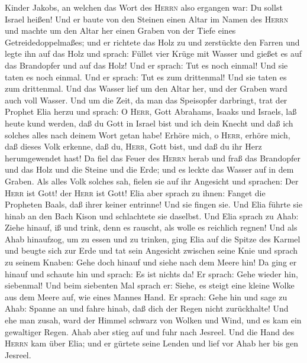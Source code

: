 Kinder Jakobs, an welchen das Wort des \textsc{Herrn} also ergangen war:
Du sollst Israel heißen!  Und er baute von den Steinen
einen Altar im Namen des \textsc{Herrn} und machte um den Altar her
einen Graben von der Tiefe eines Getreidedoppelmaßes; 
und er richtete das Holz zu und zerstückte den Farren und legte ihn auf
das Holz und sprach:  Füllet vier Krüge mit Wasser und
gießet es auf das Brandopfer und auf das Holz! Und er sprach: Tut es
noch einmal! Und sie taten es noch einmal. Und er sprach: Tut es zum
drittenmal! Und sie taten es zum drittenmal.  Und das
Wasser lief um den Altar her, und der Graben ward auch voll Wasser.
 Und um die Zeit, da man das Speisopfer darbringt, trat
der Prophet Elia herzu und sprach: O \textsc{Herr}, Gott Abrahams,
Isaaks und Israels, laß heute kund werden, daß du Gott in Israel bist
und ich dein Knecht und daß ich solches alles nach deinem Wort getan
habe!  Erhöre mich, o \textsc{Herr}, erhöre mich, daß
dieses Volk erkenne, daß du, \textsc{Herr}, Gott bist, und daß du ihr
Herz herumgewendet hast!  Da fiel das Feuer des
\textsc{Herrn} herab und fraß das Brandopfer und das Holz und die Steine
und die Erde; und es leckte das Wasser auf in dem Graben.
 Als alles Volk solches sah, fielen sie auf ihr Angesicht
und sprachen: Der \textsc{Herr} ist Gott! der \textsc{Herr} ist Gott!
 Elia aber sprach zu ihnen: Fanget die Propheten Baals,
daß ihrer keiner entrinne! Und sie fingen sie. Und Elia führte sie hinab
an den Bach Kison und schlachtete sie daselbst.  Und Elia
sprach zu Ahab: Ziehe hinauf, iß und trink, denn es rauscht, als wolle
es reichlich regnen!  Und als Ahab hinaufzog, um zu essen
und zu trinken, ging Elia auf die Spitze des Karmel und beugte sich zur
Erde und tat sein Angesicht zwischen seine Knie  und
sprach zu seinem Knaben: Gehe doch hinauf und siehe nach dem Meere hin!
Da ging er hinauf und schaute hin und sprach: Es ist nichts da! Er
sprach: Gehe wieder hin, siebenmal!  Und beim siebenten
Mal sprach er: Siehe, es steigt eine kleine Wolke aus dem Meere auf, wie
eines Mannes Hand. Er sprach: Gehe hin und sage zu Ahab: Spanne an und
fahre hinab, daß dich der Regen nicht zurückhalte!  Und
ehe man zusah, ward der Himmel schwarz von Wolken und Wind, und es kam
ein gewaltiger Regen. Ahab aber stieg auf und fuhr nach Jesreel.
 Und die Hand des \textsc{Herrn} kam über Elia; und er
gürtete seine Lenden und lief vor Ahab her bis gen Jesreel.

